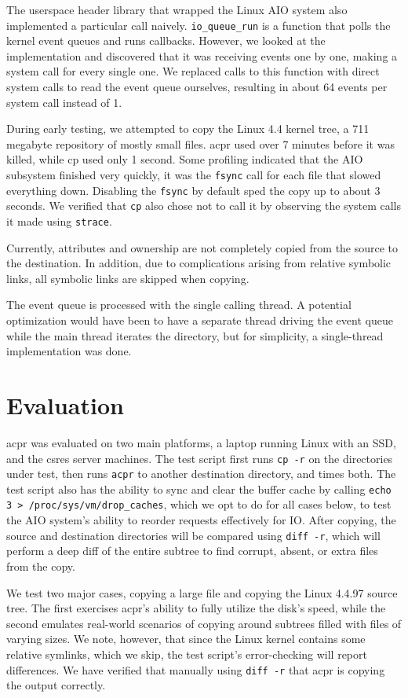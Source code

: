 \documentclass[11pt]{article}
\begin{document}
The userspace header library that wrapped the Linux AIO system also implemented
a particular call naively. \texttt{io\_queue\_run} is a function that polls the
kernel event queues and runs callbacks. However, we looked at the implementation
and discovered that it was receiving events one by one, making a system call for
every single one. We replaced calls to this function with direct system calls to
read the event queue ourselves, resulting in about 64 events per system call
instead of 1.

During early testing, we attempted to copy the Linux 4.4 kernel tree, a 711 megabyte repository of mostly small files. acpr used over 7 minutes before it was killed, while cp used only 1 second. Some profiling indicated that the AIO subsystem finished very quickly, it was the \texttt{fsync} call for each file that slowed everything down. Disabling the \texttt{fsync} by default sped the copy up to about 3 seconds. We verified that \texttt{cp} also chose not to call it by observing the system calls it made using \texttt{strace}.

Currently, attributes and ownership are not completely copied from the source to the destination. In addition, due to complications arising from relative symbolic links, all symbolic links are skipped when copying.

The event queue is processed with the single calling thread. A potential optimization would have been to have a separate thread driving the event queue while the main thread iterates the directory, but for simplicity, a single-thread implementation was done.

\section{Evaluation}
acpr was evaluated on two main platforms, a laptop running Linux with an SSD, and the csres server machines. The test script first runs \texttt{cp -r} on the directories under test, then runs \texttt{acpr} to another destination directory, and times both. The test script also has the ability to sync and clear the buffer cache by calling \texttt{echo 3 > /proc/sys/vm/drop\_caches}, which we opt to do for all cases below, to test the AIO system's ability to reorder requests effectively for IO. After copying, the source and destination directories will be compared using \texttt{diff -r}, which will perform a deep diff of the entire subtree to find corrupt, absent, or extra files from the copy.

We test two major cases, copying a large file and copying the Linux 4.4.97 source tree. The first exercises acpr's ability to fully utilize the disk's speed, while the second emulates real-world scenarios of copying around subtrees filled with files of varying sizes. We note, however, that since the Linux kernel contains some relative symlinks, which we skip, the test script's error-checking will report differences. We have verified that manually using \texttt{diff -r} that acpr is copying the output correctly. 
\end{document}
